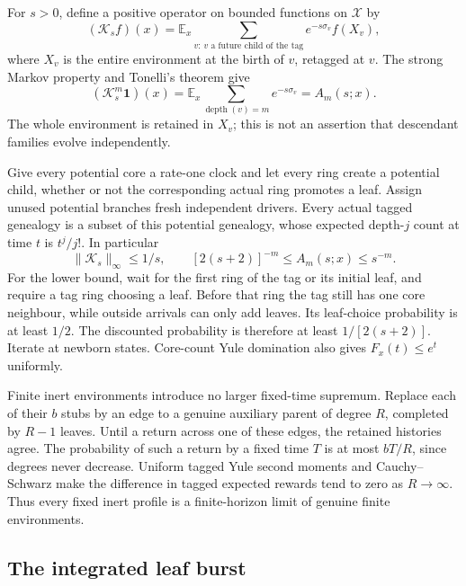 For $s>0$, define a positive operator on bounded functions on
$\mathcal X$ by
\begin{equation}\label{model:tagged-kernel}
 (\mathcal K_s f)(x)
 =\mathbb E_x\sum_{v:\,v\text{ a future child of the tag}}
             e^{-s\sigma_v} f(X_v),
\end{equation}
where $X_v$ is the entire environment at the birth of $v$, retagged
at $v$. The strong Markov property and Tonelli's theorem give
\[
 (\mathcal K_s^m\mathbf1)(x)
 =\mathbb E_x\sum_{\operatorname{depth}(v)=m}e^{-s\sigma_v}
 =A_m(s;x).
\]
The whole environment is retained in $X_v$; this is not an assertion
that descendant families evolve independently.

Give every potential core a rate-one clock and let every ring create a
potential child, whether or not the corresponding actual ring promotes
a leaf. Assign unused potential branches fresh independent drivers.
Every actual tagged genealogy is a subset of this potential genealogy,
whose expected depth-$j$ count at time $t$ is $t^j/j!$. In particular
\begin{equation}\label{model:kernel-bounds}
 \|\mathcal K_s\|_\infty\le1/s,
 \qquad [2(s+2)]^{-m}\le A_m(s;x)\le s^{-m}.
\end{equation}
For the lower bound, wait for the first ring of the tag or its initial
leaf, and require a tag ring choosing a leaf. Before that ring the
tag still has one core neighbour, while outside arrivals can only add
leaves. Its leaf-choice probability is at least $1/2$. The discounted
probability is therefore at least $1/[2(s+2)]$. Iterate at newborn
states. Core-count Yule domination also gives $F_x(t)\le e^t$ uniformly.

Finite inert environments introduce no larger fixed-time supremum.
Replace each of their $b$ stubs by an edge to a genuine auxiliary
parent of degree $R$, completed by $R-1$ leaves. Until a return across
one of these edges, the retained histories agree. The probability of
such a return by a fixed time $T$ is at most $bT/R$, since degrees
never decrease. Uniform tagged Yule second moments and
Cauchy--Schwarz make the difference in tagged expected rewards tend
to zero as $R\to\infty$. Thus every fixed inert profile is a
finite-horizon limit of genuine finite environments.

\subsection{The integrated leaf burst}

